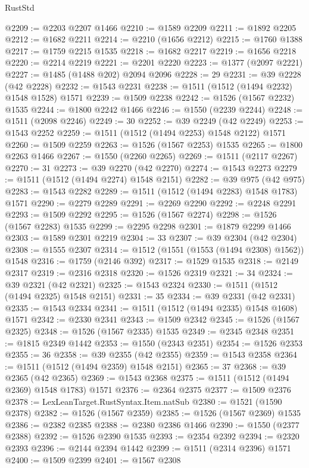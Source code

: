 \begin{lexlean}{RustStd}
\begin{coremodule}
{{@2209 := @2203 @2207 @1466
@2210 := @1589 @2209
@2211 := @1892 @2205
@2212 := @1682 @2211
@2214 := @2210 (@1656 @2212)
@2215 := @1760 @1388
@2217 := @1759 @2215 @1535
@2218 := @1682 @2217
@2219 := @1656 @2218
@2220 := @2214 @2219
@2221 := @2201 @2220
@2223 := @1377 (@2097 @2221)
@2227 := @1485 (@1488 @202) @2094 @2096
@2228 := 29
@2231 := @39 @2228 (@42 @2228)
@2232 := @1543 @2231
@2238 := @1511 (@1512 (@1494 @2232) @1548 @1528) @1571
@2239 := @1509 @2238
@2242 := @1526 (@1567 @2232) @1535
@2244 := @1800 @2242 @1466
@2246 := @1550 (@2239 @2244)
@2248 := @1511 (@2098 @2246)
@2249 := 30
@2252 := @39 @2249 (@42 @2249)
@2253 := @1543 @2252
@2259 := @1511 (@1512 (@1494 @2253) @1548 @2122) @1571
@2260 := @1509 @2259
@2263 := @1526 (@1567 @2253) @1535
@2265 := @1800 @2263 @1466
@2267 := @1550 (@2260 @2265)
@2269 := @1511 (@2117 @2267)
@2270 := 31
@2273 := @39 @2270 (@42 @2270)
@2274 := @1543 @2273
@2279 := @1511 (@1512 (@1494 @2274) @1548 @2151)
@2282 := @39 @975 (@42 @975)
@2283 := @1543 @2282
@2289 := @1511 (@1512 (@1494 @2283) @1548 @1783) @1571
@2290 := @2279 @2289
@2291 := @2269 @2290
@2292 := @2248 @2291
@2293 := @1509 @2292
@2295 := @1526 (@1567 @2274)
@2298 := @1526 (@1567 @2283) @1535
@2299 := @2295 @2298
@2301 := @1879 @2299 @1466
@2303 := @1589 @2301 @2219
@2304 := 33
@2307 := @39 @2304 (@42 @2304)
@2308 := @1555 @2307
@2314 := @1512 (@1551 (@1553 (@1494 @2308) @1562)) @1548
@2316 := @1759 (@2146 @392)
@2317 := @1529 @1535
@2318 := @2149 @2317
@2319 := @2316 @2318
@2320 := @1526 @2319
@2321 := 34
@2324 := @39 @2321 (@42 @2321)
@2325 := @1543 @2324
@2330 := @1511 (@1512 (@1494 @2325) @1548 @2151)
@2331 := 35
@2334 := @39 @2331 (@42 @2331)
@2335 := @1543 @2334
@2341 := @1511 (@1512 (@1494 @2335) @1548 @1608) @1571
@2342 := @2330 @2341
@2343 := @1509 @2342
@2345 := @1526 (@1567 @2325)
@2348 := @1526 (@1567 @2335) @1535
@2349 := @2345 @2348
@2351 := @1815 @2349 @1442
@2353 := @1550 (@2343 @2351)
@2354 := @1526 @2353
@2355 := 36
@2358 := @39 @2355 (@42 @2355)
@2359 := @1543 @2358
@2364 := @1511 (@1512 (@1494 @2359) @1548 @2151)
@2365 := 37
@2368 := @39 @2365 (@42 @2365)
@2369 := @1543 @2368
@2375 := @1511 (@1512 (@1494 @2369) @1548 @1783) @1571
@2376 := @2364 @2375
@2377 := @1509 @2376
@2378 := LexLeanTarget.RustSyntax.Item.natSub
@2380 := @1521 (@1590 @2378)
@2382 := @1526 (@1567 @2359)
@2385 := @1526 (@1567 @2369) @1535
@2386 := @2382 @2385
@2388 := @2380 @2386 @1466
@2390 := @1550 (@2377 @2388)
@2392 := @1526 @2390 @1535
@2393 := @2354 @2392
@2394 := @2320 @2393
@2396 := @2144 @2394 @1442
@2399 := @1511 (@2314 @2396) @1571
@2400 := @1509 @2399
@2401 := @1567 @2308
}}
\end{coremodule}
\end{lexlean}
